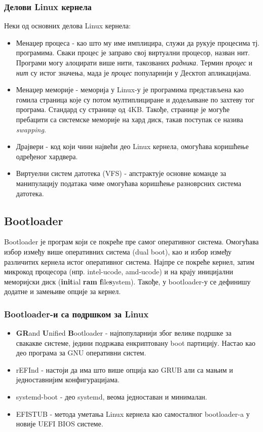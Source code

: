 \documentclass[a4paper,14pt]{article}
\begin{document}
\subsubsection{Делови Linux кернела}
Неки од основних делова Linux кернела\cite{devibm}:
\begin{itemize}
\item Менаџер процеса - као што му име имплицира, служи да рукује процесима тј. програмима. Сваки процес је заправо свој виртуални процесор, назван нит. Програми могу алоцирати више нити, такозваних \textit{радника}. Термин \textit{процес} и \textit{нит} су истог значења, мада је \textit{процес} популарнији у Десктоп апликацијама.
\item Менаџер меморије - меморија у Linux-у је програмима представљена као гомила страница које су потом мултиплициране и додељиване по захтеву тог програма. Стандард су странице од 4KB. Такође, странице је могуће пребацити са системске меморије на хард диск, такав поступак се назива \textit{swapping}.
\item Драјвери - код који чини највећи део Linux кернела, омогућава коришћење одређеног хардвера.
\item Виртуелни систем датотека (VFS) - апстрактује основне команде за манипулацију података чиме омогућава коришћење разноврсних система датотека.
\end{itemize}
\newpage

\subsection{Bootloader}
Bootloader је програм који се покреће пре самог оперативног система. Омогућава избор између више оперативних система (dual boot), као и избор између различитих кернела истог оперативног система. Најпре се покреће кернел, затим микрокод процесора (нпр. intel-ucode, amd-ucode) и на крају иницијални меморијски диск (\textbf{init}ial \textbf{ram} \textbf{f}ile\textbf{s}ystem). Такође, у bootloader-у се дефинишу додатне и замењиве опције за кернел.
\subsubsection{Bootloader-и са подршком за Linux}
\begin{itemize}
\item \textbf{GR}and \textbf{U}nified \textbf{B}ootloader - најпопуларнији због велике подршке за свакакве системе, једини подржава енкриптовану boot партицију. Настао као део програма за GNU оперативни систем.
\item rEFInd - настоји да има што више опција као GRUB али са мањим и једноставнијим конфигурацијама.
\item systemd-boot - део systemd, веома једноставан и минималан.
\item EFISTUB - метода уметања Linux кернела као самосталног bootloader-a у новије UEFI BIOS системе.
\end{itemize}
\end{document}
